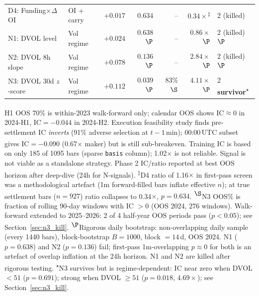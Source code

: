 \documentclass[12pt, a4paper]{article}
\theoremstyle{definition}
\begin{document}
\begin{table}[H]
\begin{tabular}{llrrrrl}
\midrule
D4: Funding$\times\Delta$OI & OI + carry & $+0.017$ & $0.634$  & -- & $0.34\times$\textsuperscript{$\ddagger$} & 2 (killed) \\
N1: DVOL level              & Vol regime & $+0.024$ & $0.638$\textsuperscript{$\P$} & -- & $0.86\times$\textsuperscript{$\P$}  & 2 (killed)\textsuperscript{$\P$} \\
N2: DVOL 8h slope           & Vol regime & $+0.078$ & $0.136$\textsuperscript{$\P$} & -- & $2.84\times$\textsuperscript{$\P$}  & 2 (killed)\textsuperscript{$\P$} \\
N3: DVOL 30d $z$-score      & Vol regime & $+0.112$ & $0.039$\textsuperscript{$\P$} & 83\%\textsuperscript{$\S$} & $\mathbf{4.11\times}$\textsuperscript{$\P$} & 2 \textbf{survivor}\textsuperscript{$\star$} \\
\bottomrule
\end{tabular}
\par\smallskip\footnotesize
\textsuperscript{\dag}H1 OOS 70\% is within-2023 walk-forward only; calendar OOS shows
IC$\approx$0 in 2024-H1, IC$=-0.044$ in 2024-H2.  Execution feasibility study finds
pre-settlement IC \emph{inverts} (91\% adverse selection at $t-1$\,min); 00:00\,UTC
subset gives IC$=-0.090$ (0.67$\times$ maker) but is still sub-breakeven.
\textsuperscript{\ddag}Training IC is based on only 185 of 1095 bars (sparse \texttt{basis}
column); 1.02$\times$ is not reliable.  Signal is not viable as a standalone strategy.
Phase 2 IC/ratio reported at best OOS horizon after deep-dive (24h for N-signals).
\textsuperscript{$\ddagger$}D4 ratio of 1.16$\times$ in first-pass screen was a methodological
artefact (1m forward-filled bars inflate effective $n$); at true settlement bars
($n=927$) ratio collapses to 0.34$\times$, $p=0.634$.
\textsuperscript{$\S$}N3 OOS\% is fraction of rolling 90-day windows with IC $>0$
(OOS 2024, 276 windows).  Walk-forward extended to 2025--2026: 2 of 4 half-year OOS
periods pass ($p < 0.05$); see Section~\ref{sec:n3_kill}.
\textsuperscript{$\P$}Rigorous daily bootstrap: non-overlapping daily sample (every 1440 bars),
block-bootstrap $B=1000$, block $=14$\,d, OOS 2024.  N1 ($p=0.638$) and N2 ($p=0.136$)
fail; first-pass 1m-overlapping $p\approx 0$ for both is an artefact of
overlap inflation at the 24h horizon.  N1 and N2 are killed after rigorous testing.
\textsuperscript{$\star$}N3 survives but is regime-dependent: IC near zero when DVOL $<51$ ($p=0.691$);
strong when DVOL $\geq 51$ ($p=0.018$, $4.69\times$); see Section~\ref{sec:n3_kill}.
\end{table}
\end{document}
